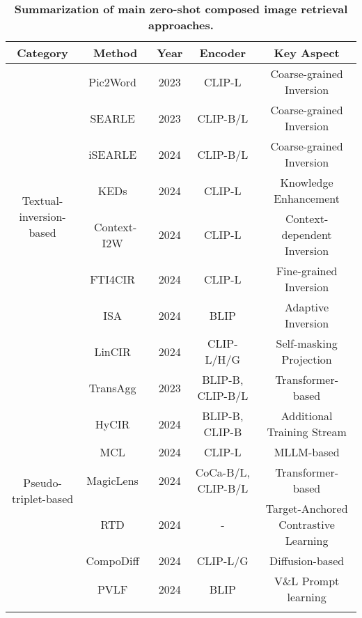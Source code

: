 \begin{table*}
    \scriptsize
    \centering
    \caption{\textbf{Summarization of main zero-shot composed image retrieval approaches.}}
  \label{tab: zs_CIR}
    \begin{tabular}{|c|c|c|c|c|}
    \hline
      Category & Method & Year & Encoder & Key Aspect\\
    \hline 
    
    \multirow{8}{*}{Textual-inversion-based} 
    & Pic2Word~\cite{pic2word} & 2023  & CLIP-L& Coarse-grained Inversion \\ 
    \cline{2-5}
    & SEARLE~\cite{searle} & 2023  & CLIP-B/L & Coarse-grained Inversion \\ 
    \cline{2-5}
    & iSEARLE~\cite{isearle} & 2024  & CLIP-B/L & Coarse-grained Inversion \\
    \cline{2-5}
    & KEDs~\cite{keds} & 2024  & CLIP-L & Knowledge Enhancement\\
    \cline{2-5}
    & Context-I2W~\cite{context_i2w} & 2024  & CLIP-L & Context-dependent Inversion\\
    \cline{2-5}
    & FTI4CIR~\cite{fti4cir} & 2024  & CLIP-L & Fine-grained Inversion \\
    \cline{2-5}
    & ISA~\cite{isa} & 2024  & BLIP & Adaptive Inversion\\
    \cline{2-5}
    & LinCIR~\cite{lincir} & 2024  & CLIP-L/H/G & Self-masking Projection\\
    
    \hline
    
    \multirow{9}{*}{Pseudo-triplet-based} 
    & TransAgg~\cite{transagg} & 2023  & BLIP-B, CLIP-B/L & Transformer-based\\
    \cline{2-5}
    & HyCIR~\cite{hycir} & 2024  & BLIP-B, CLIP-B & Additional Training Stream \\
    \cline{2-5}
    & MCL~\cite{mcl} & 2024  & CLIP-L & MLLM-based\\
    \cline{2-5}
    & MagicLens~\cite{zhang2024magiclens} & 2024  & CoCa-B/L, CLIP-B/L & Transformer-based\\
    \cline{2-5}
    
    & RTD~\cite{rtd} & 2024  & -& Target-Anchored Contrastive Learning\\
    \cline{2-5}
    & CompoDiff~\cite{compodiff} & 2024  & CLIP-L/G & Diffusion-based\\
    \cline{2-5}
    & PVLF~\cite{pvlf} & 2024  & BLIP & V\&L Prompt learning\\
    \cline{2-5}
    

\end{tabular}
\end{table*}
